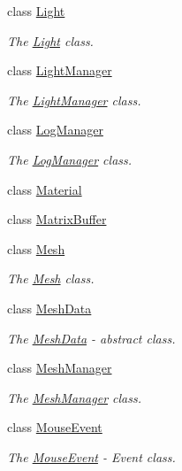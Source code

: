 \begin{DoxyCompactItemize}
class \hyperlink{classEngine_1_1Light}{Light}
\begin{DoxyCompactList}\small\item\em The \hyperlink{classEngine_1_1Light}{Light} class. \end{DoxyCompactList}\item 
class \hyperlink{classEngine_1_1LightManager}{Light\+Manager}
\begin{DoxyCompactList}\small\item\em The \hyperlink{classEngine_1_1LightManager}{Light\+Manager} class. \end{DoxyCompactList}\item 
class \hyperlink{classEngine_1_1LogManager}{Log\+Manager}
\begin{DoxyCompactList}\small\item\em The \hyperlink{classEngine_1_1LogManager}{Log\+Manager} class. \end{DoxyCompactList}\item 
class \hyperlink{classEngine_1_1Material}{Material}
\item 
class \hyperlink{classEngine_1_1MatrixBuffer}{Matrix\+Buffer}
\item 
class \hyperlink{classEngine_1_1Mesh}{Mesh}
\begin{DoxyCompactList}\small\item\em The \hyperlink{classEngine_1_1Mesh}{Mesh} class. \end{DoxyCompactList}\item 
class \hyperlink{classEngine_1_1MeshData}{Mesh\+Data}
\begin{DoxyCompactList}\small\item\em The \hyperlink{classEngine_1_1MeshData}{Mesh\+Data} -\/ abstract class. \end{DoxyCompactList}\item 
class \hyperlink{classEngine_1_1MeshManager}{Mesh\+Manager}
\begin{DoxyCompactList}\small\item\em The \hyperlink{classEngine_1_1MeshManager}{Mesh\+Manager} class. \end{DoxyCompactList}\item 
class \hyperlink{classEngine_1_1MouseEvent}{Mouse\+Event}
\begin{DoxyCompactList}\small\item\em The \hyperlink{classEngine_1_1MouseEvent}{Mouse\+Event} -\/ Event class. \end{DoxyCompactList}\item 

\end{DoxyCompactItemize}
